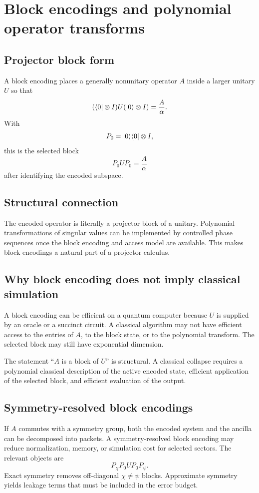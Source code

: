 \chapter{Block encodings and polynomial operator transforms}
\label{ch:block-encodings}

\section{Projector block form}
A block encoding places a generally nonunitary operator $A$ inside a larger unitary $U$ so that
\[
(\langle 0\rvert\otimes I)
U
(\lvert 0\rangle\otimes I)
=
\frac{A}{\alpha}.
\]
With
\[
P_0=\lvert 0\rangle\langle 0\rvert\otimes I,
\]
this is the selected block
\[
P_0UP_0
=
\frac{A}{\alpha}
\]
after identifying the encoded subspace.

\section{Structural connection}
The encoded operator is literally a projector block of a unitary. Polynomial transformations of singular values can be implemented by controlled phase sequences once the block encoding and access model are available. This makes block encodings a natural part of a projector calculus.

\section{Why block encoding does not imply classical simulation}
A block encoding can be efficient on a quantum computer because $U$ is supplied by an oracle or a succinct circuit. A classical algorithm may not have efficient access to the entries of $A$, to the block state, or to the polynomial transform. The selected block may still have exponential dimension.

\begin{scopebox}
The statement ``$A$ is a block of $U$'' is structural. A classical collapse requires a polynomial classical description of the active encoded state, efficient application of the selected block, and efficient evaluation of the output.
\end{scopebox}

\section{Symmetry-resolved block encodings}
If $A$ commutes with a symmetry group, both the encoded system and the ancilla can be decomposed into packets. A symmetry-resolved block encoding may reduce normalization, memory, or simulation cost for selected sectors. The relevant objects are
\[
P_\chi P_0 U P_0P_\psi.
\]
Exact symmetry removes off-diagonal $\chi\neq\psi$ blocks. Approximate symmetry yields leakage terms that must be included in the error budget.

